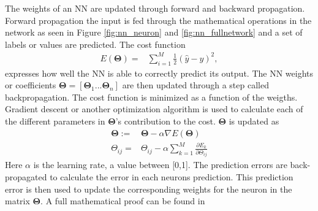         The weights of an NN are updated through forward and backward propagation. Forward propagation the input is fed through the mathematical operations in the network as seen in Figure \ref{fig:nn_neuron} and \ref{fig:nn_fullnetwork} and a set of labels or values are predicted. The cost function 
        \begin{align}
            E(\bm\Theta) = &\sum_{i=1}^M\frac{1}{2}(\hat{y} - y)^2 \nonumber,
            \label{nn:cost}
        \end{align}
        expresses how well the NN is able to correctly predict its output. The NN weights or coefficients $\bm \Theta = [\bm \Theta_1 ... \bm \Theta_n]$ are then updated through a step called backpropagation. The cost function is minimized as a function of the weigths. Gradient descent or another optimization algorithm is used to calculate each of the different parameters in $\bm \Theta$'s contribution to the cost. $\bm \Theta$ is updated as 
        \begin{align}
            \bm \Theta := & \bm \Theta - \alpha \nabla E(\bm \Theta) \nonumber \\
            \Theta_{ij} = & \Theta_{ij} - \alpha \sum_{k=1}^M \frac{\partial E_k}{\partial \Theta_{ij}} 
            \label{bp:1}
        \end{align}
        Here $\alpha$ is the learning rate, a value between [0,1]. The prediction errors are back-propagated to calculate the error in each neurons prediction. This prediction error is then used to update the corresponding weights for the neuron in the matrix $\bm \Theta$. A full mathematical proof can be found in \cite{Aasnes2017}
        
        
